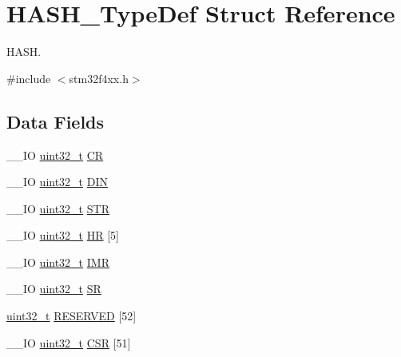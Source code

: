 \hypertarget{struct_h_a_s_h___type_def}{\section{H\-A\-S\-H\-\_\-\-Type\-Def Struct Reference}
\label{struct_h_a_s_h___type_def}
}


H\-A\-S\-H.  




{\ttfamily \#include $<$stm32f4xx.\-h$>$}

\subsection*{Data Fields}
\begin{DoxyCompactItemize}
\item 
\-\_\-\-\_\-\-I\-O \hyperlink{stdint_8h_a435d1572bf3f880d55459d9805097f62}{uint32\-\_\-t} \hyperlink{struct_h_a_s_h___type_def_adba940f3265121b77f9304b1843010ea}{C\-R}
\item 
\-\_\-\-\_\-\-I\-O \hyperlink{stdint_8h_a435d1572bf3f880d55459d9805097f62}{uint32\-\_\-t} \hyperlink{struct_h_a_s_h___type_def_ac4f283960465f7a1d318ed66d4b88f74}{D\-I\-N}
\item 
\-\_\-\-\_\-\-I\-O \hyperlink{stdint_8h_a435d1572bf3f880d55459d9805097f62}{uint32\-\_\-t} \hyperlink{struct_h_a_s_h___type_def_a4b07bc8eb36129062d3f331921316d66}{S\-T\-R}
\item 
\-\_\-\-\_\-\-I\-O \hyperlink{stdint_8h_a435d1572bf3f880d55459d9805097f62}{uint32\-\_\-t} \hyperlink{struct_h_a_s_h___type_def_acb0d3ac4cdf8c478ca0ffeebadc04840}{H\-R} \mbox{[}5\mbox{]}
\item 
\-\_\-\-\_\-\-I\-O \hyperlink{stdint_8h_a435d1572bf3f880d55459d9805097f62}{uint32\-\_\-t} \hyperlink{struct_h_a_s_h___type_def_a01011d00eb28b8798af8c5dfedf6f35d}{I\-M\-R}
\item 
\-\_\-\-\_\-\-I\-O \hyperlink{stdint_8h_a435d1572bf3f880d55459d9805097f62}{uint32\-\_\-t} \hyperlink{struct_h_a_s_h___type_def_a8af8c27ac134cbeb13af4e4e856de537}{S\-R}
\item 
\hyperlink{stdint_8h_a435d1572bf3f880d55459d9805097f62}{uint32\-\_\-t} \hyperlink{struct_h_a_s_h___type_def_a9f95e7cb8f85cae58cc429e14e96f663}{R\-E\-S\-E\-R\-V\-E\-D} \mbox{[}52\mbox{]}
\item 
\-\_\-\-\_\-\-I\-O \hyperlink{stdint_8h_a435d1572bf3f880d55459d9805097f62}{uint32\-\_\-t} \hyperlink{struct_h_a_s_h___type_def_af7ae6bac0500d97592f523fdbc1e3e12}{C\-S\-R} \mbox{[}51\mbox{]}
\end{DoxyCompactItemize}



